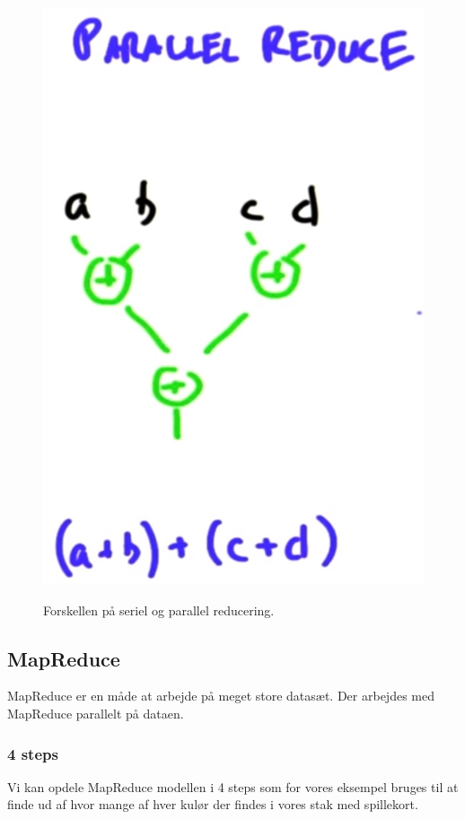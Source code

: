 \begin{figure}[H]
\begin{minipage}{.49\textwidth}
		\includegraphics[height=\si]{figs/aggregation/paraReduce}
		\label{paraReduce}
	\end{minipage}
	\caption{Forskellen på seriel og parallel reducering.}
	\label{fig:reduce}
\end{figure}

\subsection{MapReduce}
MapReduce er en måde at arbejde på meget store datasæt. Der arbejdes med MapReduce parallelt på dataen.

\subsubsection{4 steps}
Vi kan opdele MapReduce modellen i 4 steps som for vores eksempel bruges til at finde ud af hvor mange af hver kulør der findes i vores stak med spillekort.

